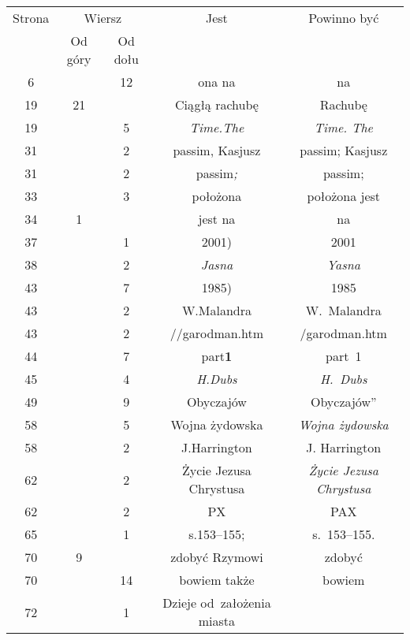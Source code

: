\documentclass[a4paper,11pt]{article}
\numberwithin{equation}{section}
\begin{document}
\begin{center}

  \begin{tabular}{|c|c|c|c|c|}
    \hline
    Strona & \multicolumn{2}{c|}{Wiersz} & Jest
                              & Powinno być \\ \cline{2-3}
    & Od góry & Od dołu & & \\
    \hline
    \hphantom{0}6 & & 12 & ona na & na \\
    19 & 21 & & Ciągłą rachubę & Rachubę \\
    19 & & \hphantom{0}5 & \textit{Time.The} & \textit{Time. The} \\
    31 & & \hphantom{0}2 & passim, Kasjusz & passim; Kasjusz \\
    31 & & \hphantom{0}2 & passim\textit{;} & passim; \\
    33 & & \hphantom{0}3 & położona & położona jest \\
    34 & \hphantom{0}1 & & jest na & na \\
    37 & & \hphantom{0}1 & 2001) & 2001 \\
    38 & & \hphantom{0}2 & \textit{Jasna} & \textit{Yasna} \\
    43 & & \hphantom{0}7 & 1985) & 1985 \\
    43 & & \hphantom{0}2 & W.Malandra & W.~Malandra \\
    43 & & \hphantom{0}2 & //garodman.htm & /garodman.htm \\
    44 & & \hphantom{0}7 & part\textbf{1} & part~1 \\
    45 & & \hphantom{0}4 & \textit{H.Dubs} & \textit{H.~Dubs} \\
    49 & & \hphantom{0}9 & Obyczajów & Obyczajów” \\
    58 & & \hphantom{0}5 & Wojna żydowska & \textit{Wojna żydowska} \\
    58 & & \hphantom{0}2 & J.Harrington & J. Harrington \\
    62 & & \hphantom{0}2 & Życie Jezusa Chrystusa
    & \textit{Życie Jezusa Chrystusa} \\
    62 & & \hphantom{0}2 & PX & PAX \\
    65 & & \hphantom{0}1 & s.153--155; & s.~153--155. \\
    70 & \hphantom{0}9 & & zdobyć Rzymowi & zdobyć \\
    70 & & 14 & bowiem także & bowiem \\
    72 & & \hphantom{0}1 &  Dzieje od~założenia miasta

\end{tabular}
\end{center}
\end{document}
